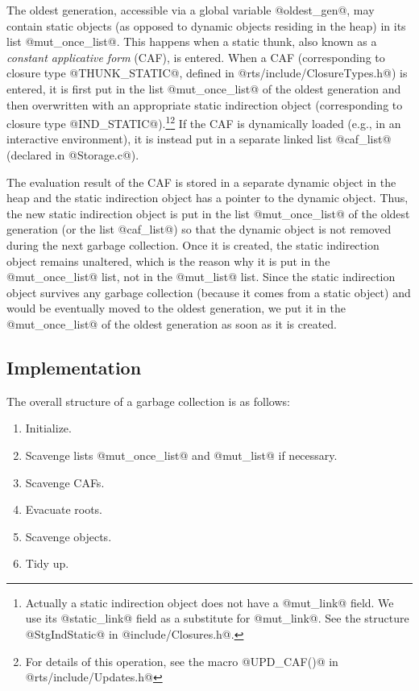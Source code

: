 \documentclass{article}
\begin{document}
The oldest generation, accessible via a global variable @oldest_gen@, may
contain static objects (as opposed to dynamic objects residing in the heap)
in its list @mut_once_list@. This happens when a static
thunk, also known as a \emph{constant applicative form} (CAF), is entered.
When a CAF (corresponding to closure type @THUNK_STATIC@, defined
in @rts/include/ClosureTypes.h@) is entered, 
it is first put in the list @mut_once_list@ of the oldest generation
and then overwritten with an appropriate static indirection object 
(corresponding to closure type @IND_STATIC@).\footnote{Actually a static 
indirection object does not have a @mut\_link@ field.
We use its @static\_link@ field as a substitute for @mut\_link@.
See the structure @StgIndStatic@ in @include/Closures.h@.}\footnote{For
details of this operation, see the macro @UPD\_CAF()@ in @rts/include/Updates.h@}
If the CAF is dynamically loaded (e.g., in an interactive environment), it is 
instead put in a separate linked list @caf_list@ 
(declared in @Storage.c@). 

The evaluation result of the 
CAF is stored in a separate dynamic object in the heap and the static 
indirection object has a pointer to the dynamic object.
Thus, the new static indirection object is put in the list 
@mut_once_list@ of the oldest generation (or the list @caf_list@) so that the 
dynamic object is not removed during the next garbage collection.
Once it is created, the static indirection object remains unaltered, which
is the reason why it is put in the @mut_once_list@ list, not in the 
@mut_list@ list.
Since the static indirection object survives any garbage collection (because
it comes from a static object) and would be eventually moved to the oldest 
generation,
we put it in the @mut_once_list@ of the oldest generation as soon
as it is created.

\subsection{Implementation}

The overall structure of a garbage collection is as follows:

\begin{enumerate}
\item[(1)] Initialize.
\item[(2)] Scavenge lists @mut_once_list@ and @mut_list@ if necessary.
\item[(3)] Scavenge CAFs.
\item[(4)] Evacuate roots.
\item[(5)] Scavenge objects.
\item[(6)] Tidy up.
\end{enumerate}
\end{document}
